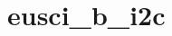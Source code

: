 \hypertarget{group__eusci__b__i2c__api}{}\section{eusci\+\_\+b\+\_\+i2c}
\label{group__eusci__b__i2c__api}
